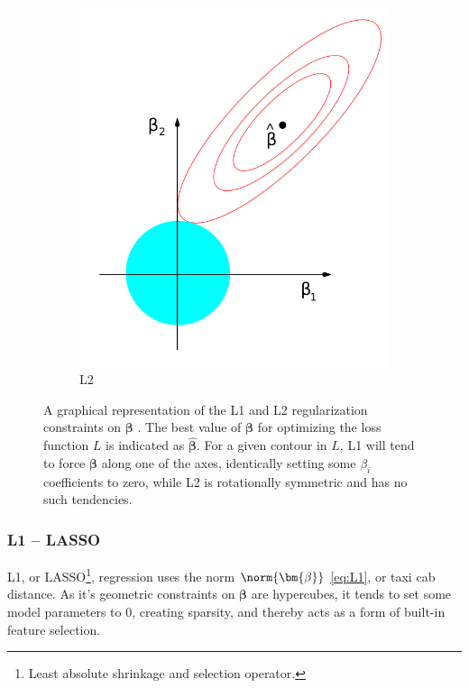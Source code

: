 \begin{figure}
\begin{subfigure}[b]{0.48\textwidth}
      \includegraphics[width=\textwidth]{figures/ml/l2.png}
  \caption{L2}
  \label{fig:ml:l1l2:L2}
  \end{subfigure}
\caption{
A graphical representation of the L1 and L2 regularization constraints on $\bm{\beta}$ \cite{HastieTF09}.
The best value of $\bm{\beta}$ for optimizing the loss function $L$ is indicated as $\hat{\bm{\beta}}$.
For a given contour in $L$, L1 will tend to force $\bm{\beta}$ along one of the axes,
identically setting some $\beta_{i}$ coefficients to zero,
while L2 is rotationally symmetric and has no such tendencies.
\label{fig:ml:l1l2}
}
\end{figure}

\subsubsection{L1 -- LASSO}
\label{ml:general:reg:L1}
L1, or LASSO\footnote{Least absolute shrinkage and selection operator.},
regression uses the norm $\norm{\bm{\beta}}$ \cref{eq:L1}, or taxi cab distance.
As it's geometric constraints on $\bm{\beta}$ are hypercubes,
it tends to set some model parameters to 0, creating sparsity,
and thereby acts as a form of built-in feature selection.

